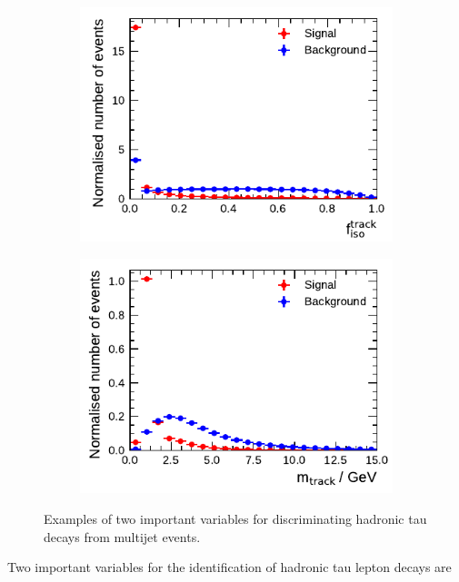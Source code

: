 \begin{figure}[t]
  \begin{subfigure}[t]{0.48\textwidth}
    \centering
    \includegraphics{./figures/baseline_bdt_vars/1p/SumPtTrkFrac.pdf}
    \label{fig:sumpttrkfrac}
  \end{subfigure}\hfill
  \begin{subfigure}[t]{0.48\textwidth}
    \centering
    \includegraphics{./figures/baseline_bdt_vars/3p/massTrkSys.pdf}
    \label{fig:masstrksys}
  \end{subfigure}
  \caption{Examples of two important variables for discriminating hadronic tau
    decays from multijet events.}
  \label{fig:bdt_discriminants}
\end{figure}
Two important variables for the identification of hadronic tau lepton decays are
